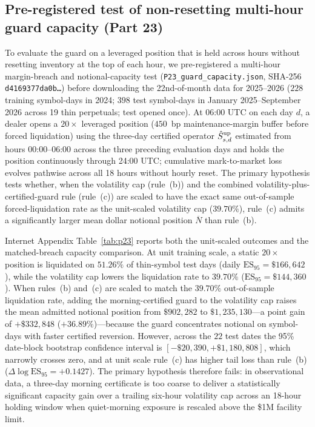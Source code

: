 \documentclass[12pt]{article}
\theoremstyle{definition}
\theoremstyle{remark}
\begin{document}
\subsection{Pre-registered test of non-resetting multi-hour guard capacity (Part 23)}\label{sec:p23}
To evaluate the guard on a leveraged position that is held across hours without resetting inventory at the top of each hour, we pre-registered a multi-hour margin-breach and notional-capacity test (\texttt{P23\_guard\_capacity.json}, SHA-256 \texttt{d4169377da0b\ldots}) before downloading the 22nd-of-month data for 2025--2026 ($228$ training symbol-days in 2024; $398$ test symbol-days in January 2025--September 2026 across 19 thin perpetuals; test opened once). At 06:00 UTC on each day $d$, a dealer opens a $20\times$ leveraged position ($450$~bp maintenance-margin buffer before forced liquidation) using the three-day certified operator $\hat S^{\rm up}_{s,d}$ estimated from hours 00:00--06:00 across the three preceding evaluation days and holds the position continuously through 24:00 UTC; cumulative mark-to-market loss evolves pathwise across all 18 hours without hourly reset. The primary hypothesis tests whether, when the volatility cap (rule~(b)) and the combined volatility-plus-certified-guard rule (rule~(c)) are scaled to have the exact same out-of-sample forced-liquidation rate as the unit-scaled volatility cap ($39.70\%$), rule~(c) admits a significantly larger mean dollar notional position $\overline{N}$ than rule~(b).



Internet Appendix Table~\ref{tab:p23} reports both the unit-scaled outcomes and the matched-breach capacity comparison. At unit training scale, a static $20\times$ position is liquidated on $51.26\%$ of thin-symbol test days (daily $\mathrm{ES}_{95}=\$166{,}642$), while the volatility cap lowers the liquidation rate to $39.70\%$ ($\mathrm{ES}_{95}=\$144{,}360$). When rules~(b) and~(c) are scaled to match the $39.70\%$ out-of-sample liquidation rate, adding the morning-certified guard to the volatility cap raises the mean admitted notional position from $\$902{,}282$ to $\$1{,}235{,}130$---a point gain of $+\$332{,}848$ ($+36.89\%$)---because the guard concentrates notional on symbol-days with faster certified reversion. However, across the $22$ test dates the 95\% date-block bootstrap confidence interval is $[-\$20{,}390,+\$1{,}180{,}808]$, which narrowly crosses zero, and at unit scale rule~(c) has higher tail loss than rule~(b) ($\Delta\log\mathrm{ES}_{95}=+0.1427$). The primary hypothesis therefore fails: in observational data, a three-day morning certificate is too coarse to deliver a statistically significant capacity gain over a trailing six-hour volatility cap across an 18-hour holding window when quiet-morning exposure is rescaled above the \$1M facility limit.
\end{document}

